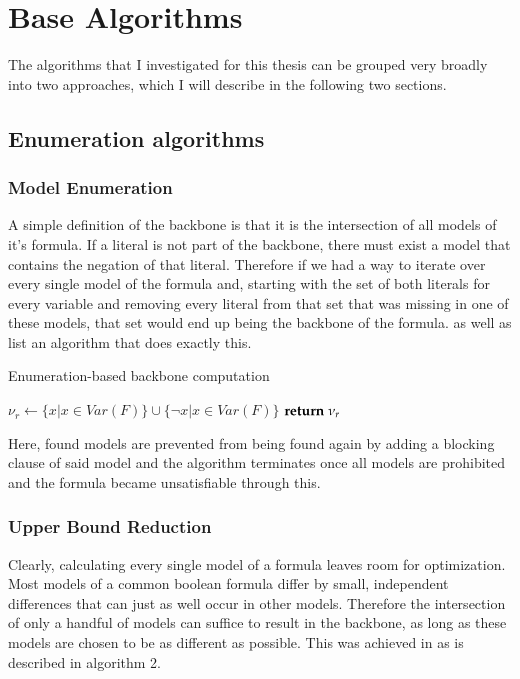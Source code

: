 \chapter{Base Algorithms}
The algorithms that I investigated for this thesis can be grouped very broadly into two approaches, which I will describe in the following two sections.

\section{Enumeration algorithms}
\subsection{Model Enumeration}
A simple definition of the backbone is that it is the intersection of all models of it's formula. If a literal is not part of the backbone, there must exist a model that contains the negation of that literal. Therefore if we had a way to iterate over every single model of the formula and, starting with the set of both literals for every variable and removing every literal from that set that was missing in one of these models, that set would end up being the backbone of the formula. \cite{mjl10} as well as \cite{mjl15} list an algorithm that does exactly this. 

\begin{algorithm} %
\caption{{\sc Enumeration-based backbone computation}}
\DontPrintSemicolon
{}
$\nu_r \gets \{ x | x \in Var(F) \} \cup \{ \neg x | x \in Var(F) \}$\;
$\Return\; \nu_r$\;
\end{algorithm}

Here, found models are prevented from being found again by adding a blocking clause of said model and the algorithm terminates once all models are prohibited and the formula became unsatisfiable through this.

\subsection{Upper Bound Reduction}

Clearly, calculating every single model of a formula leaves room for optimization. Most models of a common boolean formula differ by small, independent differences that can just as well occur in other models. Therefore the intersection of only a handful of models can suffice to result in the backbone, as long as these models are chosen to be as different as possible. This was achieved in \cite{mjl15} as is described in algorithm 2.

